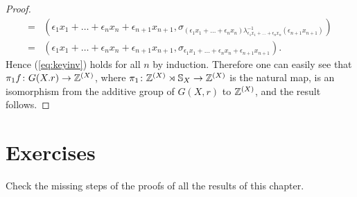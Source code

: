 \begin{proof}
\begin{align*}
    =&(\epsilon_1x_1+\dots +\epsilon_nx_n+\epsilon_{n+1}x_{n+1},\sigma_{(\epsilon_1x_1+\dots +\epsilon_nx_n)\lambda^{-1}_{\epsilon_1x_1+\dots +\epsilon_nx_n}(\epsilon_{n+1}x_{n+1})})\\
    =&(\epsilon_1x_1+\dots +\epsilon_nx_n+\epsilon_{n+1}x_{n+1},\sigma_{\epsilon_1x_1+\dots +\epsilon_nx_n+\epsilon_{n+1}x_{n+1}}).
\end{align*}
Hence (\ref{eq:keyinv}) holds for all $n$ by induction. Therefore
 one can easily see that $\pi_1f\colon G(X.r)\to\mathbb{Z}^{(X)}$, where $\pi_1\colon \mathbb{Z}^{(X)}\rtimes\mathbb{S}_X\to\mathbb{Z}^{(X)}$ is the natural map, is an isomorphism from the additive group of $G(X,r)$ to $\mathbb{Z}^{(X)}$, and the result follows. 
\end{proof}
\section*{Exercises}

\begin{prob}
Check the missing steps of the proofs of all the results of this chapter. 
\end{prob}

